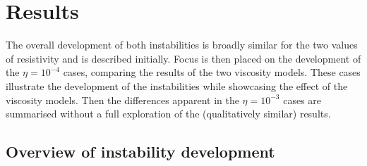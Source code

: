 \section{Results}

The overall development of both instabilities is broadly similar for the two values of resistivity and is described initially. Focus is then placed on the development of the $\eta=10^{-4}$ cases, comparing the results of the two viscosity models. These cases illustrate the development of the instabilities while showcasing the effect of the viscosity models. Then the differences apparent in the $\eta=10^{-3}$ cases are summarised without a full exploration of the (qualitatively similar) results.

\subsection{Overview of instability development}

